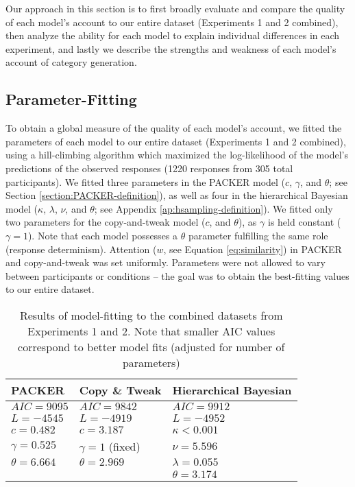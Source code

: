 \documentclass[12pt]{article}
\begin{document}
\begin{flushleft}
Our approach in this section is to first broadly evaluate and compare the quality of each model's account to our entire dataset (Experiments 1 and 2 combined), then analyze the ability for each model to explain individual differences in each experiment, and lastly we describe the strengths and weakness of each model's account of category generation.

\subsection{Parameter-Fitting}

To obtain a global measure of the quality of each model's account, we fitted the parameters of each model to our entire dataset (Experiments 1 and 2 combined), using a hill-climbing algorithm which maximized the log-likelihood of the model's predictions of the observed responses (1220 responses from 305 total participants). We fitted three parameters in the PACKER model ($c$, $\gamma$, and $\theta$; see Section \ref{section:PACKER-definition}), as well as four in the hierarchical Bayesian model ($\kappa$, $\lambda$, $\nu$, and $\theta$; see Appendix \ref{ap:hsampling-definition}). We fitted only two parameters for the copy-and-tweak model ($c$, and $\theta$), as $\gamma$ is held constant ($\gamma = 1$). Note that each model possesses a $\theta$ parameter fulfilling the same role (response determinism). Attention ($w$, see Equation \ref{eq:similarity}) in PACKER and copy-and-tweak was set uniformly. Parameters were not allowed to vary between participants or conditions -- the goal was to obtain the best-fitting values to our entire dataset.

\begin{table}
\centering
\caption{Results of model-fitting to the combined datasets from Experiments 1 and 2. Note that smaller AIC values correspond to better model fits (adjusted for number of parameters)}
\label{table:global-model-fits}
\begin{tabular}{ l l l}
\\
 \textbf{PACKER}    & \textbf{Copy \& Tweak} & \textbf{Hierarchical Bayesian} \\ 
 \hline
 $AIC = 9095$       & $AIC = 9842$          & $AIC = 9912$     \\ 
 $L = -4545$        & $L = -4919$           & $L = -4952$       \\ 
 $c = 0.482$        & $c = 3.187$           & $\kappa < 0.001$  \\
 $\gamma = 0.525$   & $\gamma = 1$ (fixed)  & $\nu = 5.596$     \\ 
 $\theta = 6.664$   & $\theta = 2.969$      & $\lambda = 0.055$    \\ 
                    &                       & $\theta = 3.174$  \\ 
\end{tabular}
\end{table}



\end{flushleft}
\end{document}

